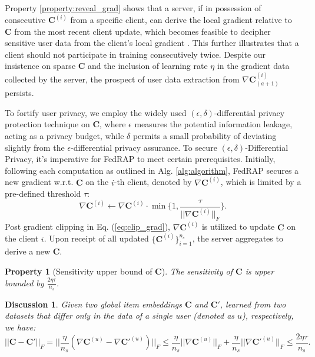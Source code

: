\documentclass{article} %
\newcommand{\customeqref}[1]{({\ref{#1}})}
\newtheorem{property}{Property}
\newtheorem{discussion}{Discussion}
\begin{document}
Property \ref{property:reveal_grad} shows that a server, if in possession of consecutive $\mathbf{C}^{(i)}$ from a specific client, can derive the local gradient relative to $\mathbf{C}$ from the most recent client update, which becomes feasible to decipher sensitive user data from the client's local gradient \citep{chai2020secure}.
This further illustrates that a client should not participate in training consecutively twice.
Despite our insistence on sparse $\mathbf{C}$ and the inclusion of learning rate $\eta$ in the gradient data collected by the server, the prospect of user data extraction from $\nabla \mathbf{C}^{(i)}_{(a+1)}$ persists.

To fortify user privacy, we employ the widely used $(\epsilon, \delta)$-differential privacy protection technique \citep{minto2021stronger} on $\mathbf{C}$, where $\epsilon$ measures the potential information leakage, acting as a privacy budget, while $\delta$ permits a small probability of deviating slightly from the $\epsilon$-differential privacy assurance.
To secure $(\epsilon, \delta)$-Differential Privacy, it's imperative for FedRAP to meet certain prerequisites. 
Initially, following each computation as outlined in Alg. \ref{alg:algorithm}, FedRAP secures a new gradient w.r.t. $\mathbf{C}$ on the $i$-th client, denoted by $\nabla \mathbf{C}^{(i)}$, which is limited by a pre-defined threshold $\tau$:
\begin{equation}
\nabla \mathbf{C}^{(i)} \leftarrow \nabla \mathbf{C}^{(i)} \cdot \min\{1, \frac{\tau}{||\nabla \mathbf{C}^{(i)}||_F}\}.
\label{eq:clip_grad}
\end{equation}
Post gradient clipping in Eq. \customeqref{eq:clip_grad}, $\nabla \mathbf{C}^{(i)}$ is utilized to update $\mathbf{C}$ on the client $i$. Upon receipt of all updated $\{\mathbf{C}^{(i)}\}^{n_s}_{i=1}$, the server aggregates to derive a new $\mathbf{C}$.

\begin{property}[Sensitivity upper bound of $\mathbf{C}$]
    \label{property:sensitivity}
    The sensitivity of $\mathbf{C}$ is upper bounded by $\frac{2\eta\tau}{n_s}$.
\end{property}

\begin{discussion}
Given two global item embeddings $\mathbf{C}$ and $\mathbf{C}'$, learned from two datasets that differ only in the data of a single user (denoted as $u$), respectively, we have:
\begin{equation}
||\mathbf{C} - \mathbf{C}'||_F = ||\frac{\eta}{n_s} (\nabla \mathbf{C}^{(u)} - \nabla \mathbf{C}'^{(u)})||_F \leq \frac{\eta}{n_s} ||\nabla \mathbf{C}^{(u)}||_F + \frac{\eta}{n_s} ||\nabla \mathbf{C}'^{(u)}||_F \leq \frac{2\eta\tau}{n_s}.
\end{equation}
\end{discussion}
\end{document}
